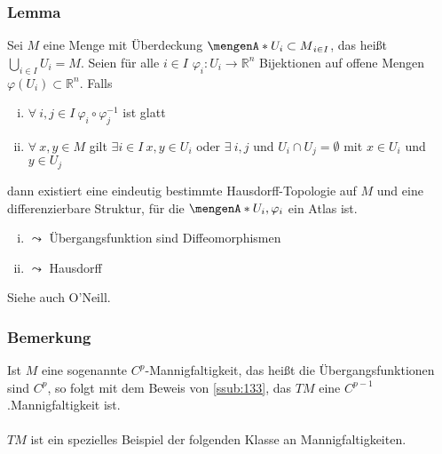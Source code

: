\subsubsection{Lemma}
\label{ssub:134}
Sei $M$ eine Menge mit Überdeckung $\set{U_i\subset M}_{i\in I}$, das heißt $\bigcup_{i\in I} U_i = M$. Seien für alle $i\in I$ $\varphi_i:U_i\to \mathds{R}^n$ Bijektionen auf offene Mengen $\varphi(U_i)\subset \mathds{R}^n$. Falls
\begin{enumerate}[(i)]
\item $\forall\ i,j\in I\ \varphi_i \circ \varphi_j^{-1}$ ist glatt
\item $\forall\ x,y\in M$ gilt $\exists i\in I\ x,y\in U_i$ oder $\exists\ i,j$ und $U_i\cap U_j = \emptyset$ mit $x\in U_i$ und $y\in U_j$
\end{enumerate}
dann existiert eine eindeutig bestimmte Hausdorff-Topologie auf $M$ und eine differenzierbare Struktur, für die $\set{U_i,\varphi_i}$ ein Atlas ist.
\begin{enumerate}[(i)]
\item $\leadsto$ Übergangsfunktion sind Diffeomorphismen
\item $\leadsto$ Hausdorff
\end{enumerate}
Siehe auch O'Neill.

\subsubsection{Bemerkung}
\label{ssub:135}
Ist $M$ eine sogenannte $C^p$-Mannigfaltigkeit, das heißt die Übergangsfunktionen sind $C^p$, so folgt mit dem Beweis von \ref{ssub:133}, das $TM$ eine $C^{p-1}$.Mannigfaltigkeit ist.\\
\\
$TM$ ist ein spezielles Beispiel der folgenden Klasse an Mannigfaltigkeiten.

